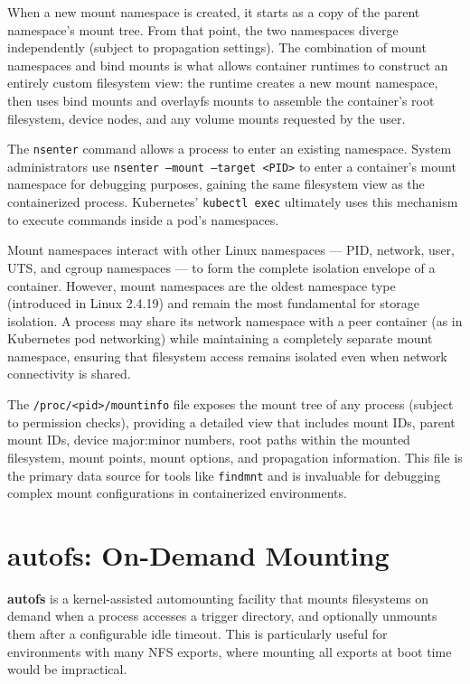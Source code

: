 When a new mount namespace is created, it starts as a copy of the parent namespace's mount tree. From that point, the two namespaces diverge independently (subject to propagation settings). The combination of mount namespaces and bind mounts is what allows container runtimes to construct an entirely custom filesystem view: the runtime creates a new mount namespace, then uses bind mounts and overlayfs mounts to assemble the container's root filesystem, device nodes, and any volume mounts requested by the user.

The \texttt{nsenter} command allows a process to enter an existing namespace. System administrators use \texttt{nsenter --mount --target <PID>} to enter a container's mount namespace for debugging purposes, gaining the same filesystem view as the containerized process. Kubernetes' \texttt{kubectl exec} ultimately uses this mechanism to execute commands inside a pod's namespaces.

Mount namespaces interact with other Linux namespaces --- PID, network, user, UTS, and cgroup namespaces --- to form the complete isolation envelope of a container. However, mount namespaces are the oldest namespace type (introduced in Linux 2.4.19) and remain the most fundamental for storage isolation. A process may share its network namespace with a peer container (as in Kubernetes pod networking) while maintaining a completely separate mount namespace, ensuring that filesystem access remains isolated even when network connectivity is shared.

The \texttt{/proc/<pid>/mountinfo} file exposes the mount tree of any process (subject to permission checks), providing a detailed view that includes mount IDs, parent mount IDs, device major:minor numbers, root paths within the mounted filesystem, mount points, mount options, and propagation information. This file is the primary data source for tools like \texttt{findmnt} and is invaluable for debugging complex mount configurations in containerized environments.

\section{autofs: On-Demand Mounting}

\textbf{autofs} is a kernel-assisted automounting facility that mounts filesystems on demand when a process accesses a trigger directory, and optionally unmounts them after a configurable idle timeout. This is particularly useful for environments with many NFS exports, where mounting all exports at boot time would be impractical.

